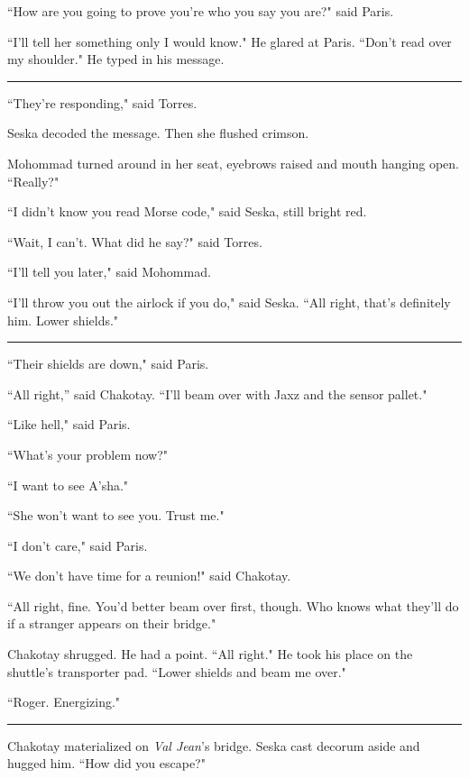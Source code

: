\documentclass[twoside,letterpaper,12pt]{memoir}
\begin{document}
``How are you going to prove you're who you say you are?" said Paris.

``I'll tell her something only I would know." He glared at Paris. ``Don't read over my shoulder." He typed in his message.

\begin{center}\rule{3cm}{0.4 pt}\end{center}

``They're responding," said Torres.

Seska decoded the message. Then she flushed crimson.

Mohommad turned around in her seat, eyebrows raised and mouth hanging open. ``Really?"

``I didn't know you read Morse code," said Seska, still bright red.

``Wait, I can't. What did he say?" said Torres.

``I'll tell you later," said Mohommad.

``I'll throw you out the airlock if you do," said Seska. ``All right, that’s definitely him. Lower shields."

\begin{center}\rule{3cm}{0.4 pt}\end{center}

``Their shields are down," said Paris.

``All right,” said Chakotay. ``I'll beam over with Jaxz and the sensor pallet."

``Like hell," said Paris.

``What's your problem now?"

``I want to see A'sha."

``She won't want to see you. Trust me."

``I don't care," said Paris.

``We don't have time for a reunion!" said Chakotay.

``All right, fine. You'd better beam over first, though. Who knows what they'll do if a stranger appears on their bridge."

Chakotay shrugged. He had a point. ``All right." He took his place on the shuttle's transporter pad. ``Lower shields and beam me over."

``Roger. Energizing."

\begin{center}\rule{3cm}{0.4 pt}\end{center}

Chakotay materialized on \textit{Val Jean}'s bridge. Seska cast decorum aside and hugged him. ``How did you escape?"
\end{document}

